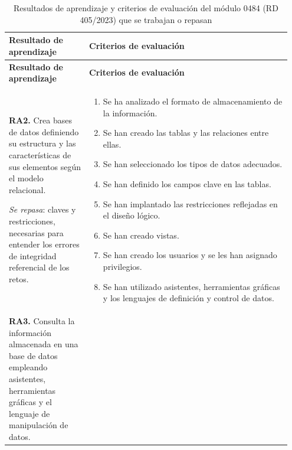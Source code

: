 \documentclass[11pt,a4paper]{article}
\newcommand{\intro}{\emoji{light-bulb}}
\begin{document}
\begin{longtable}{@{}p{0.27\linewidth}p{0.68\linewidth}@{}}
\caption{Resultados de aprendizaje y criterios de evaluación del módulo 0484 (RD 405/2023) que se trabajan o repasan}
\label{tab:ra}\\
\toprule
\textbf{Resultado de aprendizaje} & \textbf{Criterios de evaluación} \\
\midrule
\endfirsthead
\toprule
\textbf{Resultado de aprendizaje} & \textbf{Criterios de evaluación} \\
\midrule
\endhead
\bottomrule
\endfoot
\textbf{RA2.} Crea bases de datos definiendo su estructura y las características de sus
elementos según el modelo relacional.

\smallskip\emph{Se repasa}: claves y restricciones, necesarias para entender los errores de
integridad referencial de los retos.
&
\begin{enumerate}[label=\alph*), leftmargin=*, nosep]
  \item Se ha analizado el formato de almacenamiento de la información.
  \item Se han creado las tablas y las relaciones entre ellas.
  \item Se han seleccionado los tipos de datos adecuados.
  \item Se han definido los campos clave en las tablas. \intro
  \item Se han implantado las restricciones reflejadas en el diseño lógico. \intro
  \item Se han creado vistas.
  \item Se han creado los usuarios y se les han asignado privilegios.
  \item Se han utilizado asistentes, herramientas gráficas y los lenguajes de definición
        y control de datos.
\end{enumerate} \\
\textbf{RA3.} Consulta la información almacenada en una base de datos empleando
asistentes, herramientas gráficas y el lenguaje de manipulación de datos.


\end{longtable}
\end{document}
